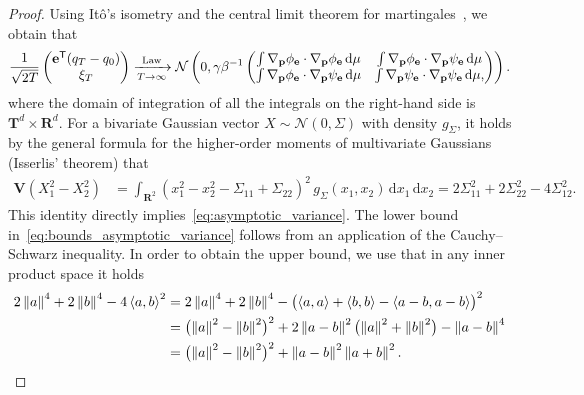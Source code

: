 \documentclass[11pt,a4paper]{article}
\newcommand{\var}[0]{\mathbf{V}}
\newcommand{\real}{\mathbf R}
\newcommand{\torus}{\mathbf T}
\newcommand{\grad}{\nabla}
\newcommand{\vect}[1]{\boldsymbol{\mathbf #1}}
\renewcommand{\d}{\mathrm d}
\renewcommand{\t}{\mathsf T}
\theoremstyle{plain}
\numberwithin{equation}{section}
\begin{document}
\begin{proof}
    Using It\^o's isometry and the central limit theorem for martingales~\cite[Theorem 3.3]{pavliotis2008multiscale},
    we obtain that
    \[
        \frac{1}{\sqrt{2T}}
        \begin{pmatrix}
            \vect e^\t (q_T - q_0) \\
            \xi_T
        \end{pmatrix}
        \xrightarrow[T \to \infty]{\rm Law}
        \mathcal N \left(0,
            \gamma \beta^{-1}
            \begin{pmatrix}
                \int \grad_{\vect p} \phi_{\vect e} \cdot \grad_{\vect p} \phi_{\vect e} \, \d \mu & \int \grad_{\vect p} \phi_{\vect e} \cdot \grad_{\vect p} \psi_{\vect e} \, \d \mu \\
                \int \grad_{\vect p} \phi_{\vect e} \cdot \grad_{\vect p} \psi_{\vect e} \, \d \mu & \int \grad_{\vect p} \psi_{\vect e} \cdot \grad_{\vect p} \psi_{\vect e} \, \d \mu,
            \end{pmatrix}
        \right).
    \]
    where the domain of integration of all the integrals on the right-hand side is $\torus^d \times \real^d$.
    For a bivariate Gaussian vector $X \sim \mathcal N(0, \Sigma)$ with density $g_{\Sigma}$,
    it holds by the general formula for the higher-order moments of multivariate Gaussians (Isserlis' theorem)
    that
    \begin{align*}
        \var (X_1^2 - X_2^2)
        &= \int_{\real^2} \left( x_1^2 - x_2^2 - \Sigma_{11} + \Sigma_{22} \right)^2 \, g_{\Sigma}(x_1, x_2) \, \d x_1 \, \d x_2
        = 2 \Sigma_{11}^2 + 2 \Sigma_{22}^2 - 4 \Sigma_{12}^2.
    \end{align*}
    This identity directly implies~\eqref{eq:asymptotic_variance}.
    The lower bound in~\eqref{eq:bounds_asymptotic_variance} follows from an application of the Cauchy--Schwarz inequality.
    In order to obtain the upper bound,
    we use that in any inner product space it holds
    \begin{align*}
        2 \norm{a}^4 + 2 \norm{b}^4 - 4\ip{a}{b}^2
        &= 2 \norm{a}^4 + 2 \norm{b}^4 - \bigl(\ip{a}{a} + \ip{b}{b} - \ip{a-b}{a-b} \bigr)^2 \\
        &= \bigl(\norm{a}^2 - \norm{b}^2 \bigr)^2 + 2 \norm{a-b}^2 \bigl(\norm{a}^2 + \norm{b}^2 \bigr) - \norm{a-b}^4 \\
        &= \bigl(\norm{a}^2 - \norm{b}^2 \bigr)^2 + \norm{a-b}^2 \norm{a + b}^2.
    \end{align*}

\end{proof}
\end{document}
